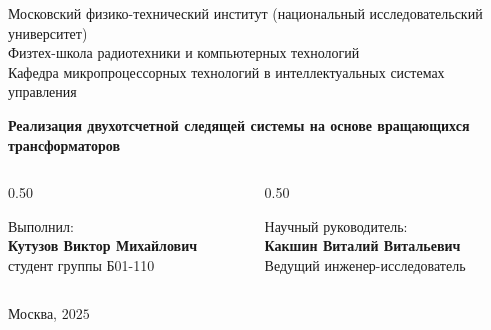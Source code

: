 \documentclass{beamer} %
\begin{document}
\begin{frame}
  \begin{center}\tiny
    Московский физико-технический институт (национальный исследовательский университет)\\
    Физтех-школа радиотехники и компьютерных технологий\\
    Кафедра микропроцессорных технологий в интеллектуальных системах управления
  \end{center}


  \vspace{1 cm}
  \begin{center}\large
    \vspace{0.2cm}
    \vspace{0.1cm}
    \textbf{Реализация двухотсчетной следящей системы на основе вращающихся трансформаторов}
  \end{center}

  \vspace{2 cm}

  \begin{columns}
    \begin{column}{0.50\textwidth}
      \begin{center}\tiny
        Выполнил: \\
        \vspace{0.1cm}
        \textbf{Кутузов Виктор Михайлович}\\
        студент группы Б01-110 \\
      \end{center}
    \end{column}

    \begin{column}{0.50\textwidth}
      \begin{center}\tiny
        Научный руководитель:\\
        \vspace{0.1cm}
        \textbf{Какшин Виталий Витальевич} \\
        Ведущий инженер-исследователь
      \end{center}
    \end{column}
  \end{columns}

  \vspace{0.5cm}
  \begin{center}\tiny
    Москва, $2025$
  \end{center}
\end{frame}
\end{document}
